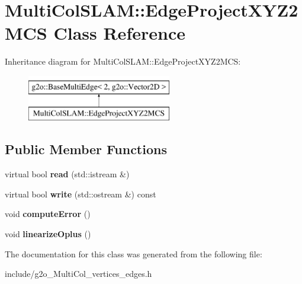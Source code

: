 \hypertarget{classMultiColSLAM_1_1EdgeProjectXYZ2MCS}{}\section{Multi\+Col\+S\+L\+AM\+:\+:Edge\+Project\+X\+Y\+Z2\+M\+CS Class Reference}
\label{classMultiColSLAM_1_1EdgeProjectXYZ2MCS}
Inheritance diagram for Multi\+Col\+S\+L\+AM\+:\+:Edge\+Project\+X\+Y\+Z2\+M\+CS\+:\begin{figure}[H]
\begin{center}
\leavevmode
\includegraphics[height=2.000000cm]{classMultiColSLAM_1_1EdgeProjectXYZ2MCS}
\end{center}
\end{figure}
\subsection*{Public Member Functions}
\begin{DoxyCompactItemize}
\item 
virtual bool {\bfseries read} (std\+::istream \&)\hypertarget{classMultiColSLAM_1_1EdgeProjectXYZ2MCS_a3209ed8727aacd154af127e459f46cf8}{}\label{classMultiColSLAM_1_1EdgeProjectXYZ2MCS_a3209ed8727aacd154af127e459f46cf8}

\item 
virtual bool {\bfseries write} (std\+::ostream \&) const \hypertarget{classMultiColSLAM_1_1EdgeProjectXYZ2MCS_a8c7d9e00cbfdb3afddf35d2280e82e67}{}\label{classMultiColSLAM_1_1EdgeProjectXYZ2MCS_a8c7d9e00cbfdb3afddf35d2280e82e67}

\item 
void {\bfseries compute\+Error} ()\hypertarget{classMultiColSLAM_1_1EdgeProjectXYZ2MCS_a5f7748e82b07f9d8b26f9583300276b5}{}\label{classMultiColSLAM_1_1EdgeProjectXYZ2MCS_a5f7748e82b07f9d8b26f9583300276b5}

\item 
void {\bfseries linearize\+Oplus} ()\hypertarget{classMultiColSLAM_1_1EdgeProjectXYZ2MCS_aea66f5096425d15763c1409876915625}{}\label{classMultiColSLAM_1_1EdgeProjectXYZ2MCS_aea66f5096425d15763c1409876915625}

\end{DoxyCompactItemize}


The documentation for this class was generated from the following file\+:\begin{DoxyCompactItemize}
\item 
include/g2o\+\_\+\+Multi\+Col\+\_\+vertices\+\_\+edges.\+h\end{DoxyCompactItemize}
